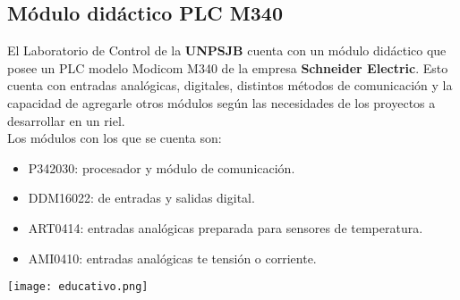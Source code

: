 \subsection{Módulo didáctico PLC M340} \label{sec:didac}

El Laboratorio de Control de la \textbf{UNPSJB} cuenta con un módulo didáctico que posee un PLC modelo Modicom M340 de la empresa \textbf{Schneider Electric}. Esto cuenta con entradas analógicas, digitales, distintos métodos de comunicación y la capacidad de agregarle otros módulos según las necesidades de los proyectos a desarrollar en un riel.  \\
Los módulos con los que se cuenta son:
\begin{itemize}
	\item P342030: procesador y módulo de comunicación.
	\item DDM16022: de entradas y salidas digital.
	\item ART0414: entradas analógicas preparada para sensores de temperatura.
	\item AMI0410: entradas analógicas te tensión o corriente. 
	
\end{itemize}
\begin{center}
	\texttt{[image: educativo.png]}
	\label{fig:didac}
\end{center}




